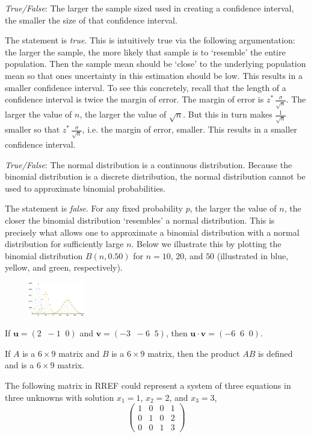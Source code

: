 \documentclass[11pt,letterpaper]{article}
\begin{document}
\quizsol \textit{True/False}: The larger the sample sized used in creating a confidence interval, the smaller the size of that confidence interval. \pspace

\sol The statement is \textit{true}. This is intuitively true via the following argumentation: the larger the sample, the more likely that sample is to `resemble' the entire population. Then the sample mean should be `close' to the underlying population mean so that ones uncertainty in this estimation should be low. This results in a smaller confidence interval. To see this concretely, recall that the length of a confidence interval is twice the margin of error. The margin of error is $z^* \, \frac{\sigma}{\sqrt{n}}$. The larger the value of $n$, the larger the value of $\sqrt{n}$. But this in turn makes $\frac{1}{\sqrt{n}}$ smaller so that $z^* \, \frac{\sigma}{\sqrt{n}}$, i.e. the margin of error, smaller. This results in a smaller confidence interval. \pvspace{1.3cm}



\quizsol \textit{True/False}: The normal distribution is a continuous distribution. Because the binomial distribution is a discrete distribution, the normal distribution cannot be used to approximate binomial probabilities. \pspace

\sol The statement is \textit{false}. For any fixed probability $p$, the larger the value of $n$, the closer the binomial distribution `resembles' a normal distribution. This is precisely what allows one to approximate a binomial distribution with a normal distribution for sufficiently large $n$. Below we illustrate this by plotting the binomial distribution $B(n, 0.50)$ for $n= 10$, $20$, and $50$ (illustrated in blue, yellow, and green, respectively). 
	\begin{figure}[!ht]
	\centering
	\includegraphics[width= 0.22\textwidth]{binomial.png}
	\end{figure}




If $\mathbf{u}= (2 \;\;-1\;\;0)$ and $\mathbf{v}= (-3\;\;-6\;\;5)$, then $\mathbf{u} \cdot \mathbf{v}= (-6\;\;6\;\;0)$. 






\newpage


If $A$ is a $6 \times 9$ matrix and $B$ is a $6 \times 9$ matrix, then the product $AB$ is defined and is a $6 \times 9$ matrix. 

The following matrix in RREF could represent a system of three equations in three unknowns with solution $x_1= 1$, $x_2= 2$, and $x_3= 3$,
	\[
	\begin{pmatrix}
	1 & 0 & 0 & 1 \\
	0 & 1 & 0 & 2 \\
	0 & 0 & 1 & 3 
	\end{pmatrix}
	\]
\end{document}

